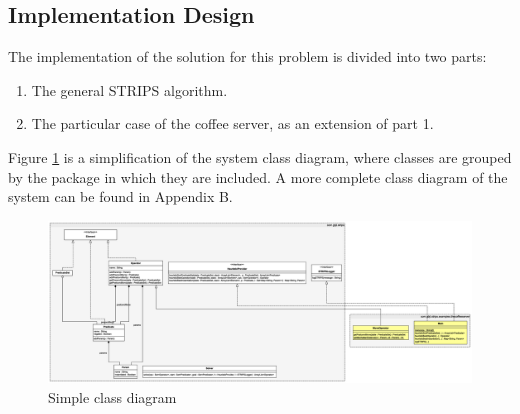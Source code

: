 \documentclass[12pt,a4paper,oneside]{article}
\numberwithin{equation}{section}
\numberwithin{equation}{section}
\theoremstyle{definition}
\begin{document}
\begin{itemize}
\section{Implementation Design} \label{Implementation Design}

The implementation of the solution for this problem is divided into two parts:
\begin{enumerate}
	\item The general STRIPS algorithm.
	\item The particular case of the coffee server, as an extension of part 1.
\end{enumerate}
Figure \ref{simplediagram} is a simplification of the system class diagram, where classes are grouped by the package in which they are included. A more complete class diagram of the system can be found in Appendix B.

\begin{figure}[h!]
	\begin{center}
	\includegraphics[scale=0.22]{simple}
	\end{center}
	\caption{Simple class diagram}
	\label{simplediagram}
\end{figure}


\end{itemize}
\end{document}
